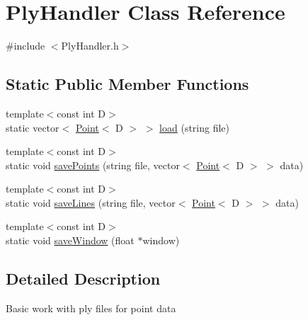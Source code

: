 \hypertarget{classPlyHandler}{\section{Ply\-Handler Class Reference}
\label{classPlyHandler}
}


{\ttfamily \#include $<$Ply\-Handler.\-h$>$}

\subsection*{Static Public Member Functions}
\begin{DoxyCompactItemize}
\item 
{\footnotesize template$<$const int D$>$ }\\static vector$<$ \hyperlink{structPoint}{Point}$<$ D $>$ $>$ \hyperlink{classPlyHandler_a125b6822706e4f4da1349f4e1aa11a53}{load} (string file)
\item 
{\footnotesize template$<$const int D$>$ }\\static void \hyperlink{classPlyHandler_a1ae0c0c8a36138646795af8e6215c609}{save\-Points} (string file, vector$<$ \hyperlink{structPoint}{Point}$<$ D $>$ $>$ data)
\item 
{\footnotesize template$<$const int D$>$ }\\static void \hyperlink{classPlyHandler_a444313ab537951a9f4845d6cedc238f3}{save\-Lines} (string file, vector$<$ \hyperlink{structPoint}{Point}$<$ D $>$ $>$ data)
\item 
{\footnotesize template$<$const int D$>$ }\\static void \hyperlink{classPlyHandler_a81e659f8981caa1581db8389be2f06c6}{save\-Window} (float $\ast$window)
\end{DoxyCompactItemize}


\subsection{Detailed Description}
Basic work with ply files for point data 

